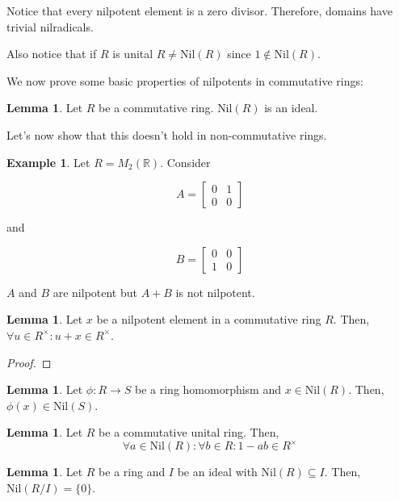 \documentclass{article}
\theoremstyle{definition}
\newtheorem{lemma}[theorem]{Lemma}
\newtheorem{example}[theorem]{Example}
\newcommand{\R}{\mathbb{R}}
\newcommand{\Nil}{\text{Nil}}
\begin{document}
Notice that every nilpotent element is a zero divisor. 
Therefore, domains have trivial nilradicals.

Also notice that if $R$ is unital $R \neq \Nil(R)$ since $1 \notin \Nil(R)$.

We now prove some basic properties of nilpotents in commutative rings:

\begin{lemma}
    Let $R$ be a commutative ring. $\Nil(R)$ is an ideal.
\end{lemma}

Let's now show that this doesn't hold in non-commutative rings.

\begin{example}
    Let $R = M_{2}(\R)$. Consider 

    \[ A = \begin{bmatrix} 0 & 1 \\ 0 & 0 \end{bmatrix}  \]

    and
    
    \[ B = \begin{bmatrix} 0 & 0 \\ 1 & 0 \end{bmatrix}  \]

    $A$ and $B$ are nilpotent but $A+B$ is not nilpotent.
\end{example}

\begin{lemma}
    Let  $x$ be a nilpotent element in a commutative ring $R$. Then, $\forall u \in R^{\times}: u + x \in R^{\times}$.
\end{lemma}
\begin{proof}
    
\end{proof}

\begin{lemma}
    Let $\phi: R \xrightarrow{} S$ be a ring homomorphism and $x \in \Nil(R)$.
    Then, $\phi(x) \in \Nil(S)$.
\end{lemma}

\begin{lemma}
    Let $R$ be a commutative unital ring. Then,
    \[ \forall a \in \Nil(R): \forall b \in R: 1 - ab \in R^{\times} \]
\end{lemma}

\begin{lemma}
    Let $R$ be a ring and $I$ be an ideal with $\Nil(R) \subseteq I$.
    Then, $\Nil(R/I) = \{0\}$.
\end{lemma}
\end{document}
